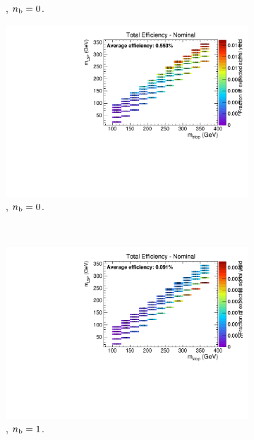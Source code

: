 \begin{figure}[ht!]
\begin{subfigure}[b]{0.32\textwidth}
    \caption{\njlow, $n_{\text{b}} = 0$.}
  \end{subfigure}
  \begin{subfigure}[b]{0.32\textwidth}
    \includegraphics[width=\textwidth, page=6]{Figs/sms/t2cc/v24/JES_T2cc_v24_eq0b_le3j_incl.pdf}
    \caption{\njlow, $n_{\text{b}} = 0$.}
  \end{subfigure}\\
  \begin{subfigure}[b]{0.32\textwidth}
    \includegraphics[width=\textwidth, page=4]{Figs/sms/t2cc/v24/JES_T2cc_v24_eq1b_le3j_incl.pdf}
    \caption{\njlow, $n_{\text{b}} = 1$.}
  \end{subfigure}
  \begin{subfigure}[b]{0.32\textwidth}

\end{subfigure}
\end{figure}
